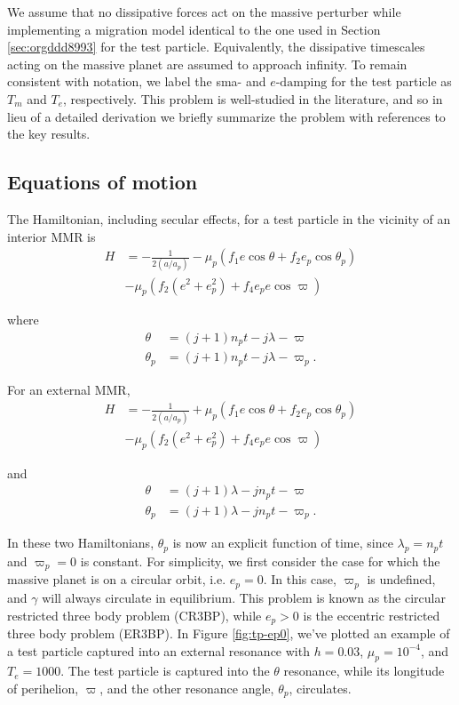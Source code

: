 \documentclass[usenatbib,twocolumn]{mnras}
\begin{document}
We assume that no dissipative forces act on the massive perturber
while implementing a migration model identical to the one used in
Section \ref{sec:orgddd8993} for the test particle.
Equivalently, the dissipative timescales acting on the massive planet
are assumed to approach infinity.  To remain consistent with notation,
we label the sma- and \(e\text{-damping}\) for the test particle as
\(T_{m}\) and \(T_{e}\), respectively. This problem is well-studied in the
literature, and so in lieu of a detailed derivation we briefly
summarize the problem with references to the key results.

\subsection{Equations of motion}
\label{sec:org16e5b65}
The Hamiltonian, including secular effects, for a test particle in the
vicinity of an interior MMR is
\citep[c.f.][]{xu_migration_2018,goldreich_overstable_2014,wisdom_canonical_1986,deck_migration_2015,henrard86_reduc_trans_apocen_librat}
\begin{align*}
  \label{eq:tpint}
  H
  &= - \frac{1}{2(a/a_p)} - \mu_p\left(f_1
    e\cos\theta +f_2 e_p\cos\theta_p\right) \\
  &- \mu_p \left(f_2\left(e^2 + e_p^2\right)
    + f_4e_p e\cos\varpi\right)
\end{align*}

\noindent
where
\begin{align}
  \theta &= (j+1)n_p t - j\lambda - \varpi \\
  \theta_p &= (j+1)n_p t - j\lambda - \varpi_p.
\end{align}

\noindent
For an external MMR, 
\begin{align*}
  \label{eq:tpext}
  H
  &= - \frac{1}{2(a/a_p)} + \mu_p\left(f_1
    e\cos\theta +f_2
    e_p\cos\theta_p\right) \\
  &- \mu_p \left(f_2\left(e^2
      + e_p^2\right) + f_4e_p
    e\cos\varpi\right)
\end{align*}

\noindent
and
\begin{align}
  \theta &= (j+1)\lambda - jn_pt - \varpi \\
  \theta_p &= (j+1)\lambda - jn_pt - \varpi_p.
\end{align}

In these two Hamiltonians, \(\theta_p\) is now an explicit function of
time, since \(\lambda_p=n_p t\) and \(\varpi_p=0\) is constant.  For
simplicity, we first consider the case for which the massive planet is
on a circular orbit, i.e. \(e_p=0\).
In this case, \(\varpi_p\) is undefined, and \(\gamma\) will
always circulate in equilibrium.
This problem is known as the circular restricted three
body problem (CR3BP), while \(e_p>0\) is the eccentric restricted three
body problem (ER3BP).  In Figure \ref{fig:tp-ep0}, we've plotted an
example of a test particle captured into an external resonance with
\(h=0.03\), \(\mu_p = 10^{-4}\), and \(T_{e} = 1000\).  The test particle is
captured into the \(\theta\) resonance, while its longitude of
perihelion, \(\varpi\), and the other resonance angle, \(\theta_p\),
circulates.
\end{document}
